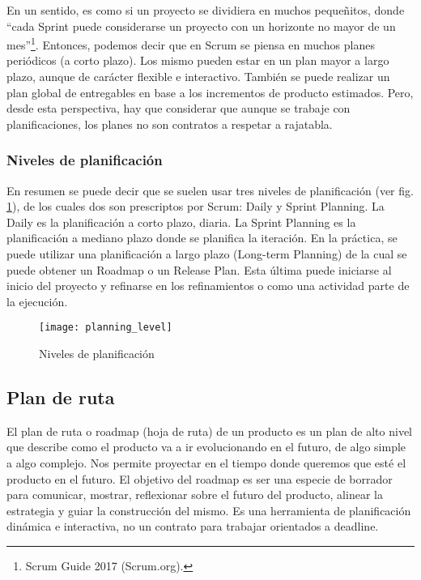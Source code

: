 En un sentido, es como si un proyecto se dividiera en muchos pequeñitos, donde “cada Sprint puede considerarse un proyecto con un horizonte no mayor de un mes”\footnote{Scrum Guide 2017 (Scrum.org).}. Entonces, podemos decir que en Scrum se piensa en muchos planes periódicos (a corto plazo). Los mismo pueden estar en un plan mayor a largo plazo, aunque de carácter flexible e interactivo. También se puede realizar un plan global de entregables en base a los incrementos de producto estimados. Pero, desde esta perspectiva, hay que considerar que aunque se trabaje con planificaciones, los planes no son contratos a respetar a rajatabla.

\subsubsection{Niveles de planificación}

En resumen se puede decir que se suelen usar tres niveles de planificación (ver fig. \ref{fig:planning_level}), de los cuales dos son prescriptos por Scrum: Daily y Sprint Planning. La Daily es la planificación a corto plazo, diaria. La Sprint Planning es la planificación a mediano plazo donde se planifica la iteración. En la práctica, se puede utilizar una planificación a largo plazo (Long-term Planning) de la cual se puede obtener un Roadmap o un Release Plan. Esta última puede iniciarse al inicio del proyecto y refinarse en los refinamientos o como una actividad parte de la ejecución.

\begin{figure}[h]
  \centering
  \texttt{[image: planning\_level]}
  \caption{Niveles de planificación}
  \centering
  \label{fig:planning_level} %
\end{figure}
\FloatBarrier %

\subsection{Plan de ruta}

El plan de ruta o roadmap (hoja de ruta) de un producto es un plan de alto nivel que describe como el producto va a ir evolucionando en el futuro, de algo simple a algo complejo. Nos permite proyectar en el tiempo donde queremos que esté el producto en el futuro. El objetivo del roadmap es ser una especie de borrador para comunicar, mostrar, reflexionar sobre el futuro del producto, alinear la estrategia y guiar la construcción del mismo. Es una herramienta de planificación dinámica e interactiva, no un contrato para trabajar orientados a deadline.

